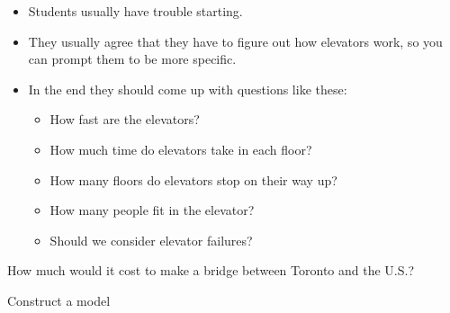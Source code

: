 \begin{annotation}
	\begin{notes}
		\begin{itemize}
			\item Students usually have trouble starting. 
			\item They usually agree that they have to figure out how elevators work, so you can prompt them to be more specific. 
			
			\item In the end they should come up with questions like these:
			\begin{itemize}
				\item How fast are the elevators?
				\item How much time do elevators take in each floor?
				\item How many floors do elevators stop on their way up?
				\item How many people fit in the elevator?
				\item Should we consider elevator failures?
			\end{itemize}
		\end{itemize}	
	\end{notes}
\end{annotation}




\bookonlynewpage

\hfill

\bookonlynewpage

\question How much would it cost to make a bridge between Toronto and the U.S.?














\standardonlynewpage

%
%



\begin{module}{Construct a model}
	\label{model}

\begin{siam}
	
	
\end{siam}

\end{module}




